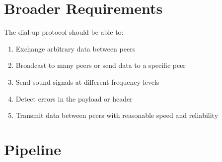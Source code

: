 \documentclass{article}
\begin{document}
\section{Broader Requirements}
The dial-up protocol should be able to:
\begin{enumerate}
  \item Exchange arbitrary data between peers
  \item Broadcast to many peers or send data to a specific peer
  \item Send sound signals at different frequency levels
  \item Detect errors in the payload or header
  \item Transmit data between peers with reasonable speed and reliability
\end{enumerate}
\section{Pipeline}
\end{document}

